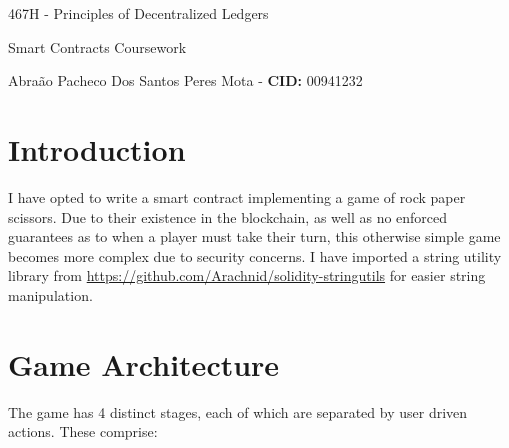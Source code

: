 \documentclass[a4paper, twoside]{article}
\title{}
\author{Abra\~{a}o Pacheco Dos Santos Peres Mota}
\begin{document}
	
	\begin{center}
	\Large{467H - Principles of Decentralized Ledgers
		
		Smart Contracts Coursework} 
	
	\Large{Abra\~{a}o Pacheco Dos Santos Peres Mota - }
	\large{\textbf{CID:} 00941232}
	\end{center}

\section{Introduction}

I have opted to write a smart contract implementing a game of rock paper scissors. Due to their existence in the blockchain, as well as no enforced guarantees as to when a player must take their turn, this otherwise simple game becomes more complex due to security concerns. I have imported a string utility library from \url{https://github.com/Arachnid/solidity-stringutils} for easier string manipulation. 

\section{Game Architecture}

The game has 4 distinct stages, each of which are separated by user driven actions. These comprise:
\end{document}
